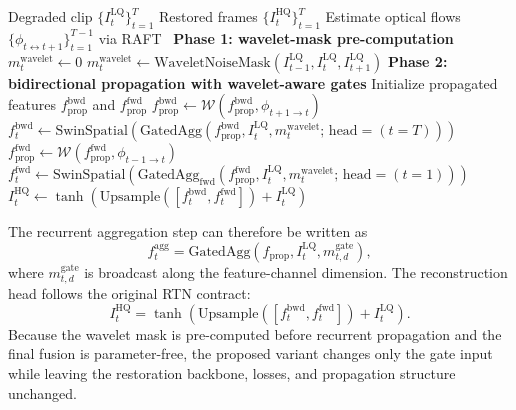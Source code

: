 {\begin{algorithm}[H]
\caption{WaveletMask forward pass for a $T$-frame clip.\label{alg:waveletmask}}
\begin{algorithmic}[1]
\Require Degraded clip $\{I_t^{\mathrm{LQ}}\}_{t=1}^{T}$
\Ensure Restored frames $\{I_t^{\mathrm{HQ}}\}_{t=1}^{T}$
\State Estimate optical flows $\{\phi_{t\leftrightarrow t+1}\}_{t=1}^{T-1}$ via RAFT~\cite{teed2020raft}
\Statex \textbf{Phase 1: wavelet-mask pre-computation}
        \State $m_t^{\mathrm{wavelet}}\gets 0$
    \Else
        \State $m_t^{\mathrm{wavelet}}\gets \mathrm{WaveletNoiseMask}(I_{t-1}^{\mathrm{LQ}},I_t^{\mathrm{LQ}},I_{t+1}^{\mathrm{LQ}})$ 
    \EndIf
\EndFor
\Statex \textbf{Phase 2: bidirectional propagation with wavelet-aware gates}
\State Initialize propagated features $f_{\mathrm{prop}}^{\mathrm{bwd}}$ and $f_{\mathrm{prop}}^{\mathrm{fwd}}$
     \State $f_{\mathrm{prop}}^{\mathrm{bwd}}\gets\mathcal{W}(f_{\mathrm{prop}}^{\mathrm{bwd}},\phi_{t+1\to t})$ \EndIf
    \State $f_t^{\mathrm{bwd}}\gets\mathrm{SwinSpatial}\!\left(\mathrm{GatedAgg}\!\left(f_{\mathrm{prop}}^{\mathrm{bwd}},I_t^{\mathrm{LQ}},m_t^{\mathrm{wavelet}};\,\mathrm{head}=(t=T)\right)\right)$
\EndFor
{}
     \State $f_{\mathrm{prop}}^{\mathrm{fwd}}\gets\mathcal{W}(f_{\mathrm{prop}}^{\mathrm{fwd}},\phi_{t-1\to t})$ \EndIf
    \State $f_t^{\mathrm{fwd}}\gets\mathrm{SwinSpatial}\!\left(\mathrm{GatedAgg}_{\mathrm{fwd}}\!\left(f_{\mathrm{prop}}^{\mathrm{fwd}},I_t^{\mathrm{LQ}},m_t^{\mathrm{wavelet}};\,\mathrm{head}=(t=1)\right)\right)$
    \State $I_t^{\mathrm{HQ}}\gets\tanh(\mathrm{Upsample}([f_t^{\mathrm{bwd}},f_t^{\mathrm{fwd}}])+I_t^{\mathrm{LQ}})$ 
\EndFor
\end{algorithmic}
\end{algorithm}

The recurrent aggregation step can therefore be written as
\begin{equation}\label{eq:gated_agg}
    f_t^{\mathrm{agg}} = \mathrm{GatedAgg}\!\left(f_{\mathrm{prop}},I_t^{\mathrm{LQ}},m_{t,d}^{\mathrm{gate}}\right),
\end{equation}
where $m_{t,d}^{\mathrm{gate}}$ is broadcast along the feature-channel dimension. The reconstruction head follows the original RTN contract:
\begin{equation}\label{eq:reconstruction}
    I_t^{\mathrm{HQ}} = \tanh\!\left(\mathrm{Upsample}\!\left([f_t^{\mathrm{bwd}},f_t^{\mathrm{fwd}}]\right)+I_t^{\mathrm{LQ}}\right).
\end{equation}
Because the wavelet mask is pre-computed before recurrent propagation and the final fusion is parameter-free, the proposed variant changes only the gate input while leaving the restoration backbone, losses, and propagation structure unchanged.

}
